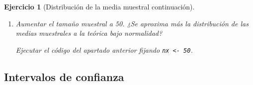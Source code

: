 \documentclass[
  10pt,
]{book}
\newenvironment{Shaded}{\begin{snugshade}}{\end{snugshade}}
\newcommand{\AttributeTok}[1]{\textcolor[rgb]{0.77,0.63,0.00}{#1}}
\newcommand{\CommentTok}[1]{\textcolor[rgb]{0.56,0.35,0.01}{\textit{#1}}}
\newcommand{\ConstantTok}[1]{\textcolor[rgb]{0.00,0.00,0.00}{#1}}
\newcommand{\DecValTok}[1]{\textcolor[rgb]{0.00,0.00,0.81}{#1}}
\newcommand{\FloatTok}[1]{\textcolor[rgb]{0.00,0.00,0.81}{#1}}
\newcommand{\FunctionTok}[1]{\textcolor[rgb]{0.00,0.00,0.00}{#1}}
\newcommand{\NormalTok}[1]{#1}
\newcommand{\SpecialCharTok}[1]{\textcolor[rgb]{0.00,0.00,0.00}{#1}}
\newcommand{\StringTok}[1]{\textcolor[rgb]{0.31,0.60,0.02}{#1}}
\theoremstyle{break}
\newtheorem{exercise}{Ejercicio}[chapter]
\theoremstyle{nonumberplain}
\renewcommand{\CommentTok}[1]{\textcolor[rgb]{0.41,0.41,0.41}{\texttt{#1}}}
\begin{document}
\begin{exercise}[Distribución de la media muestral continuación]
\begin{enumerate}
\begin{Shaded}
\end{Shaded}

  \begin{figure}[!htbp]

  {\centering \texttt{[image: 07-Monte\_Carlo\_files/figure-latex/medexp-1]} 

  }

  \caption{Distribución de la media muestral de una distribución exponencial y distribución asintótica.}\label{fig:medexp}
  \end{figure}
\item
  Aumentar el tamaño muestral a 50. ¿Se aproxima más la
  distribución de las medias muestrales a la teórica bajo
  normalidad?

  Ejecutar el código del apartado anterior fijando \texttt{nx\ \textless{}-\ 50}.
\end{enumerate}

\end{exercise}

\hypertarget{intervalos-de-confianza}{%
\subsection{Intervalos de confianza}\label{intervalos-de-confianza}}
\end{document}

